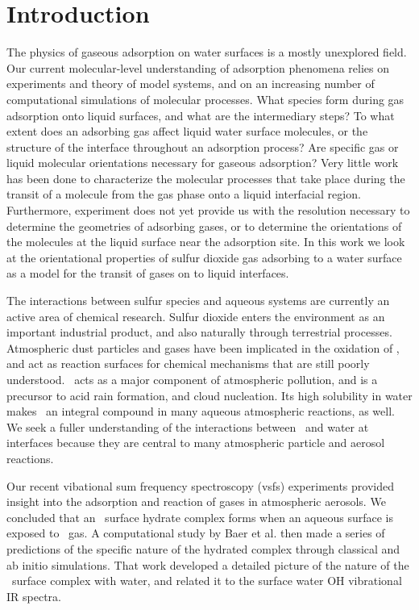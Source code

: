 \section{Introduction}

The physics of gaseous adsorption on water surfaces is a mostly unexplored field. Our current molecular-level understanding of adsorption phenomena relies on experiments and theory of model systems, and on an increasing number of computational simulations of molecular processes. What species form during gas adsorption onto liquid surfaces, and what are the intermediary steps? To what extent does an adsorbing gas affect liquid water surface molecules, or the structure of the interface throughout an adsorption process? Are specific gas or liquid molecular orientations necessary for gaseous adsorption? Very little work has been done to characterize the molecular processes that take place during the transit of a molecule from the gas phase onto a liquid interfacial region. Furthermore, experiment does not yet provide us with the resolution necessary to determine the geometries of adsorbing gases, or to determine the orientations of the molecules at the liquid surface near the adsorption site. In this work we look at the orientational properties of sulfur dioxide gas adsorbing to a water surface as a model for the transit of gases on to liquid interfaces.

The interactions between sulfur species and aqueous systems are currently an active area of chemical research. Sulfur dioxide enters the environment as an important industrial product, and also naturally through terrestrial processes. Atmospheric dust particles and gases have been implicated in the oxidation of \suldiox, and act as reaction surfaces for chemical mechanisms that are still poorly understood.\cite{Baltrusaitis2011,Rubasinghege2010,Li2007} \suldiox~acts as a major component of atmospheric pollution, and is a precursor to acid rain formation, and cloud nucleation. Its high solubility in water makes \suldiox~an integral compound in many aqueous atmospheric reactions, as well. We seek a fuller understanding of the interactions between \suldiox~and water at interfaces because they are central to many atmospheric particle and aerosol reactions.

Our recent vibational sum frequency spectroscopy (vsfs) experiments provided insight into the adsorption and reaction of gases in atmospheric aerosols.\cite{Tarbuck2005,Tarbuck2006} We concluded that an \suldiox~surface hydrate complex forms when an aqueous surface is exposed to \suldiox~gas. A computational study by Baer et al.\cite{Baer2010} then made a series of predictions of the specific nature of the hydrated complex through classical and ab initio simulations. That work developed a detailed picture of the nature of the \suldiox~surface complex with water, and related it to the surface water OH vibrational IR spectra.

